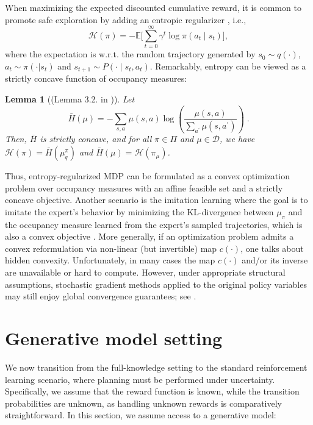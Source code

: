 \documentclass{article}
\numberwithin{equation}{section}
\newtheorem{lemma}{Lemma}
\newcommand{\eqsp}{\;}
\begin{document}
When maximizing the expected discounted cumulative reward, it is common to promote safe exploration by adding an entropic regularizer \citep{neu2017unified}, i.e.,
$$
    \mathcal{H}(\pi)=-\mathbb{E}
	\bigg[\sum_{t=0}^{\infty} \gamma^{t} \log \pi\left(a_{t} \mid s_{t}\right) \bigg],
$$
where the expectation is w.r.t. the random trajectory generated by $s_0\sim q(\cdot)$, $a_t\sim \pi(\cdot|s_t)$ and $s_{t+1} \sim P(\cdot \mid s_t, a_t)$.
Remarkably, entropy can be viewed as a strictly concave function of occupancy measures:
\begin{lemma}[(Lemma 3.2. in \cite{ho2016generative})]
	\label{concavity}
	Let
	$$
	\bar{H}(\mu)=-\sum_{s, a} \mu(s, a) \log \left(\frac{\mu(s, a)}{\sum_{a^{\prime}} \mu\left(s, a^{\prime}\right)}\right)\eqsp.
	$$
	Then, $\bar{H}$ is strictly concave, and for all $\pi \in \Pi$ and $\mu \in \mathcal{D}$, we have $\mathcal{H}(\pi)=\bar{H}\left(\mu_q^\pi\right)$ and $\bar{H}(\mu)=\mathcal{H}\left(\pi_\mu\right)$.
\end{lemma}
Thus, entropy-regularized MDP can be formulated as a convex optimization problem over occupancy measures with an affine feasible set and a strictly concave objective.
Another scenario is the imitation learning where the goal is to imitate the expert's behavior by minimizing the KL-divergence between $\mu_\pi$ and the occupancy measure learned from the expert's sampled trajectories, which is also a convex objective \cite{zhang2020variational}. More generally, if an optimization problem admits a convex reformulation via non-linear (but invertible) map $c(\cdot)$, one talks about hidden convexity. Unfortunately, in many cases the map $c(\cdot)$ and/or its inverse are unavailable or hard to compute. 
However, under appropriate structural assumptions, stochastic gradient methods applied to the original policy variables may still enjoy global convergence guarantees; see \cite{fatkhullin2023stochastic}.

\section{Generative model setting}\label{sec:gen_model}
We now transition from the full-knowledge setting to the standard reinforcement learning scenario, where planning must be performed under uncertainty. Specifically, we assume that the reward function is known, while the transition probabilities are unknown, as handling unknown rewards is comparatively straightforward.
In this section, we assume access to a generative model:
\end{document}
